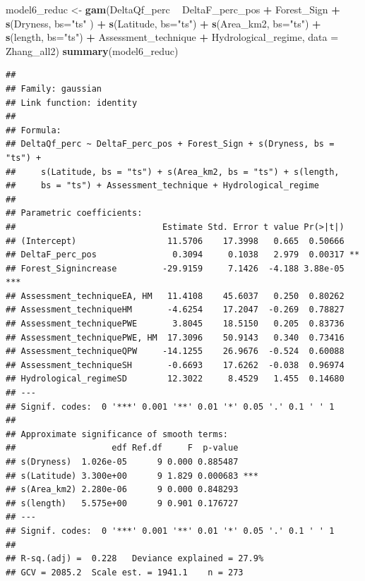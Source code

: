 \documentclass[]{elsarticle} %
\newenvironment{Shaded}{\begin{snugshade}}{\end{snugshade}}
\newcommand{\DataTypeTok}[1]{\textcolor[rgb]{0.13,0.29,0.53}{#1}}
\newcommand{\KeywordTok}[1]{\textcolor[rgb]{0.13,0.29,0.53}{\textbf{#1}}}
\newcommand{\NormalTok}[1]{#1}
\newcommand{\OperatorTok}[1]{\textcolor[rgb]{0.81,0.36,0.00}{\textbf{#1}}}
\newcommand{\StringTok}[1]{\textcolor[rgb]{0.31,0.60,0.02}{#1}}
\begin{document}
\begin{Shaded}
\begin{Highlighting}[]
\NormalTok{model6_reduc <-}\StringTok{ }\KeywordTok{gam}\NormalTok{(DeltaQf_perc }\OperatorTok{~}\StringTok{ }\NormalTok{DeltaF_perc_pos }\OperatorTok{+}\StringTok{ }\NormalTok{Forest_Sign }\OperatorTok{+}\StringTok{ }
\StringTok{                    }\KeywordTok{s}\NormalTok{(Dryness, }\DataTypeTok{bs=}\StringTok{"ts"}\NormalTok{ ) }\OperatorTok{+}\StringTok{ }\KeywordTok{s}\NormalTok{(Latitude, }\DataTypeTok{bs=}\StringTok{"ts"}\NormalTok{) }\OperatorTok{+}\StringTok{ }
\StringTok{                      }\KeywordTok{s}\NormalTok{(Area_km2, }\DataTypeTok{bs=}\StringTok{"ts"}\NormalTok{) }\OperatorTok{+}\StringTok{  }\KeywordTok{s}\NormalTok{(length, }\DataTypeTok{bs=}\StringTok{"ts"}\NormalTok{) }\OperatorTok{+}
\StringTok{                    }\NormalTok{Assessment_technique }\OperatorTok{+}
\StringTok{                    }\NormalTok{Hydrological_regime, }\DataTypeTok{data =}\NormalTok{ Zhang_all2)}
\KeywordTok{summary}\NormalTok{(model6_reduc)}
\end{Highlighting}
\end{Shaded}

\begin{verbatim}
## 
## Family: gaussian 
## Link function: identity 
## 
## Formula:
## DeltaQf_perc ~ DeltaF_perc_pos + Forest_Sign + s(Dryness, bs = "ts") + 
##     s(Latitude, bs = "ts") + s(Area_km2, bs = "ts") + s(length, 
##     bs = "ts") + Assessment_technique + Hydrological_regime
## 
## Parametric coefficients:
##                             Estimate Std. Error t value Pr(>|t|)    
## (Intercept)                  11.5706    17.3998   0.665  0.50666    
## DeltaF_perc_pos               0.3094     0.1038   2.979  0.00317 ** 
## Forest_Signincrease         -29.9159     7.1426  -4.188 3.88e-05 ***
## Assessment_techniqueEA, HM   11.4108    45.6037   0.250  0.80262    
## Assessment_techniqueHM       -4.6254    17.2047  -0.269  0.78827    
## Assessment_techniquePWE       3.8045    18.5150   0.205  0.83736    
## Assessment_techniquePWE, HM  17.3096    50.9143   0.340  0.73416    
## Assessment_techniqueQPW     -14.1255    26.9676  -0.524  0.60088    
## Assessment_techniqueSH       -0.6693    17.6262  -0.038  0.96974    
## Hydrological_regimeSD        12.3022     8.4529   1.455  0.14680    
## ---
## Signif. codes:  0 '***' 0.001 '**' 0.01 '*' 0.05 '.' 0.1 ' ' 1
## 
## Approximate significance of smooth terms:
##                   edf Ref.df     F  p-value    
## s(Dryness)  1.026e-05      9 0.000 0.885487    
## s(Latitude) 3.300e+00      9 1.829 0.000683 ***
## s(Area_km2) 2.280e-06      9 0.000 0.848293    
## s(length)   5.575e+00      9 0.901 0.176727    
## ---
## Signif. codes:  0 '***' 0.001 '**' 0.01 '*' 0.05 '.' 0.1 ' ' 1
## 
## R-sq.(adj) =  0.228   Deviance explained = 27.9%
## GCV = 2085.2  Scale est. = 1941.1    n = 273
\end{verbatim}
\end{document}
